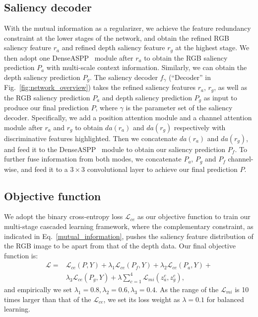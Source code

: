 \documentclass[10pt,twocolumn,letterpaper]{article}
\begin{document}
\subsection{Saliency decoder}
With the mutual information as a regularizer, we achieve the feature redundancy constraint at the lower stages of the network, and obtain the refined RGB saliency feature $r_a$ and refined depth saliency feature $r_g$ at the highest stage. We then adopt one DenseASPP~\cite{denseaspp} module after $r_a$ to obtain the RGB saliency prediction $P_a$ with multi-scale context information. Similarly, we can obtain the depth saliency prediction $P_g$.
The saliency decoder $f_\gamma$ (\enquote{Decoder} in Fig.~\ref{fig:network_overview}) takes the refined saliency features $r_a$, $r_g$, as well as the RGB saliency prediction $P_a$ and depth saliency prediction $P_g$ as input to produce our final prediction $P$, where $\gamma$ is the parameter set of the saliency decoder.
Specifically,
we add a position attention module and a channel attention module \cite{fu2019dual} after $r_a$ and $r_g$ to obtain $da(r_a)$ and $da(r_g)$ respectively with discriminative features highlighted.
Then we concatenate $da(r_a)$ and $da(r_g)$, and
feed it to the DenseASPP~\cite{denseaspp} module to obtain our saliency prediction $P_f$. To further fuse information from both modes, we concatenate $P_a$, $P_g$ and $P_f$ channel-wise, and feed it to a $3\times3$ convolutional layer
to achieve our final prediction $P$.

\subsection{Objective function}
\label{obj_fun_sec}
We adopt the binary cross-entropy loss $\mathcal{L}_{ce}$ as our objective function to train our multi-stage cascaded learning framework,
where the complementary constraint, as indicated in Eq.~\eqref{mutual_information}, pushes the saliency feature distribution of the RGB image to be apart from that of the depth data.
Our final objective function is:
\begin{equation}
\label{loss_function}
\begin{aligned}
    \mathcal{L} = & \mathcal{L}_{ce}(P,Y)+\lambda_1\mathcal{L}_{ce}(P_f,Y)+\lambda_2\mathcal{L}_{ce}(P_a,Y)+\\
    &\lambda_3\mathcal{L}_{ce}(P_g,Y)+\lambda \sum_{c=1}^4\mathcal{L}_{mi}(z_a^c,z_g^c),
\end{aligned}
\end{equation}
and empirically we set $\lambda_1=0.8, \lambda_2=0.6, \lambda_3=0.4$.
As the range of the $\mathcal{L}_{mi}$ is 10 times larger than that of the $\mathcal{L}_{ce}$, we set its loss weight as $\lambda=0.1$ for balanced learning.
\end{document}
